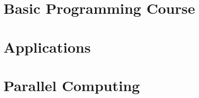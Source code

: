 \documentclass[12pt,twoside=semi,a4paper]{scrbook}
\begin{document}
 

 \thispagestyle{empty}
 \newpage
 \cleardoublepage 

 \pagestyle{plain}
 

 \cleardoublepage 
 
 \tableofcontents

 \newpage

 \cleardoublepage 

 \pagestyle{plain}



 


 
 \chapter{Basic Programming Course}
  \label{chapter:basics-explained}

  

  \newpage
  
  \newpage
  
  \newpage
  
  \newpage
  
  
% 
%  
% 
%  



 \chapter{Applications}
  \label{chapter:application}

  

  \newpage
  
  \newpage
  
  \newpage
  


 
 \chapter{Parallel Computing}
  \label{chapter:parallel}
  
  
  \newpage
  

\end{document}
